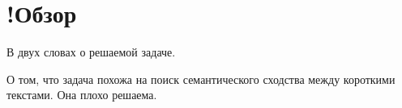 \section{!Обзор}
    В двух словах о решаемой задаче.

    О том, что задача похожа на поиск семантического сходства между короткими текстами. Она плохо решаема.

    
    
    
    
    




